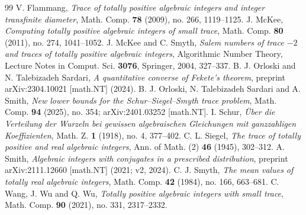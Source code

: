 \documentclass[11pt,a4paper]{article}
\begin{document}
\begin{thebibliography}{99}
 V. Flammang, \emph{Trace of totally positive algebraic integers
  and integer transfinite diameter}, Math. Comp. \textbf{78} (2009), no. 266,
  1119--1125.
 J. McKee, \emph{Computing totally positive algebraic integers of
  small trace}, Math. Comp. \textbf{80} (2011), no. 274, 1041--1052.
 J. McKee and C. Smyth, \emph{Salem numbers of trace $-2$ and traces
  of totally positive algebraic integers}, Algorithmic Number Theory, Lecture
  Notes in Comput. Sci. \textbf{3076}, Springer, 2004, 327--337.
 B. J. Orloski and N. Talebizadeh Sardari, \emph{A quantitative
  converse of Fekete's theorem}, preprint arXiv:2304.10021 [math.NT] (2024).
 B. J. Orloski, N. Talebizadeh Sardari and A. Smith, \emph{New
  lower bounds for the Schur--Siegel--Smyth trace problem}, Math. Comp.
  \textbf{94} (2025), no. 354; arXiv:2401.03252 [math.NT].
 I. Schur, \emph{\"Uber die Verteilung der Wurzeln bei gewissen
  algebraischen Gleichungen mit ganzzahligen Koeffizienten}, Math. Z. \textbf{1}
  (1918), no. 4, 377--402.
 C. L. Siegel, \emph{The trace of totally positive and real
  algebraic integers}, Ann. of Math. (2) \textbf{46} (1945), 302--312.
 A. Smith, \emph{Algebraic integers with conjugates in a prescribed
  distribution}, preprint arXiv:2111.12660 [math.NT] (2021; v2, 2024).
 C. J. Smyth, \emph{The mean values of totally real algebraic
  integers}, Math. Comp. \textbf{42} (1984), no. 166, 663--681.
 C. Wang, J. Wu and Q. Wu, \emph{Totally positive algebraic
  integers with small trace}, Math. Comp. \textbf{90} (2021), no. 331,
  2317--2332.
\end{thebibliography}
\end{document}

